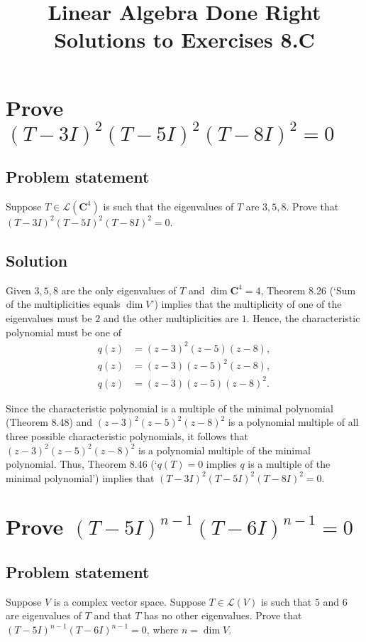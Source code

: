 \documentclass{article}
\title{Linear Algebra Done Right\\Solutions to Exercises 8.C}
\author{}
\date{}
\begin{document}
\maketitle

\section{Prove $(T-3I)^2(T-5I)^2(T-8I)^2=0$}
\subsection*{Problem statement}
Suppose $T\in\mathcal{L}(\mathbf{C}^4)$ is such that the eigenvalues of $T$ are $3,5,8$. 
Prove that $(T-3I)^2(T-5I)^2(T-8I)^2=0$.

\subsection*{Solution}
Given $3,5,8$ are the only eigenvalues of $T$ and $\operatorname{dim}\mathbf{C}^4=4$, Theorem 8.26 (`Sum of the multiplicities equals $\operatorname{dim}V$') implies that the multiplicity of one of the eigenvalues must be $2$ and the other multiplicities are $1$. 
Hence, the characteristic polynomial must be one of
\begin{align*}
    q(z)&=(z-3)^2(z-5)(z-8),\\
    q(z)&=(z-3)(z-5)^2(z-8),\\
    q(z)&=(z-3)(z-5)(z-8)^2.
\end{align*}

Since the characteristic polynomial is a multiple of the minimal polynomial (Theorem 8.48) and $(z-3)^2(z-5)^2(z-8)^2$ is a polynomial multiple of all three possible characteristic polynomials, it follows that 
\newline
$(z-3)^2(z-5)^2(z-8)^2$ is a polynomial multiple of the minimal polynomial. 
Thus, Theorem 8.46 (`$q(T)=0$ implies $q$ is a multiple of the minimal polynomial') implies that $(T-3I)^2(T-5I)^2(T-8I)^2=0$.

\clearpage

\section{Prove $(T-5I)^{n-1}(T-6I)^{n-1}=0$}
\subsection*{Problem statement}
Suppose $V$ is a complex vector space. 
Suppose $T\in\mathcal{L}(V)$ is such that $5$ and $6$ are eigenvalues of $T$ and that $T$ has no other eigenvalues. Prove that 
\newline
$(T-5I)^{n-1}(T-6I)^{n-1}=0$, where $n=\operatorname{dim}V$.
\end{document}
